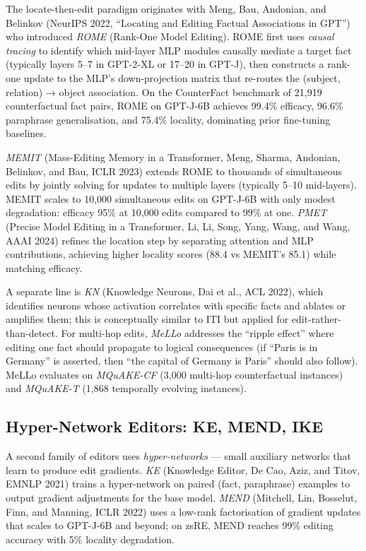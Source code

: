 \documentclass{article}
\begin{document}
The locate-then-edit paradigm originates with Meng, Bau, Andonian, and Belinkov (NeurIPS 2022, ``Locating and Editing Factual Associations in GPT'') who introduced \emph{ROME} (Rank-One Model Editing). ROME first uses \emph{causal tracing} to identify which mid-layer MLP modules causally mediate a target fact (typically layers 5--7 in GPT-2-XL or 17--20 in GPT-J), then constructs a rank-one update to the MLP's down-projection matrix that re-routes the (subject, relation) → object association. On the CounterFact benchmark of 21,919 counterfactual fact pairs, ROME on GPT-J-6B achieves 99.4\% efficacy, 96.6\% paraphrase generalisation, and 75.4\% locality, dominating prior fine-tuning baselines.

\emph{MEMIT} (Mass-Editing Memory in a Transformer, Meng, Sharma, Andonian, Belinkov, and Bau, ICLR 2023) extends ROME to thousands of simultaneous edits by jointly solving for updates to multiple layers (typically 5--10 mid-layers). MEMIT scales to 10,000 simultaneous edits on GPT-J-6B with only modest degradation: efficacy 95\% at 10,000 edits compared to 99\% at one. \emph{PMET} (Precise Model Editing in a Transformer, Li, Li, Song, Yang, Wang, and Wang, AAAI 2024) refines the location step by separating attention and MLP contributions, achieving higher locality scores (88.4 vs MEMIT's 85.1) while matching efficacy.

A separate line is \emph{KN} (Knowledge Neurons, Dai et al., ACL 2022), which identifies neurons whose activation correlates with specific facts and ablates or amplifies them; this is conceptually similar to ITI but applied for edit-rather-than-detect. For multi-hop edits, \emph{MeLLo} \citep{zhong2023mquakeassessingkno} addresses the ``ripple effect'' where editing one fact should propagate to logical consequences (if ``Paris is in Germany'' is asserted, then ``the capital of Germany is Paris'' should also follow). MeLLo evaluates on \emph{MQuAKE-CF} (3,000 multi-hop counterfactual instances) and \emph{MQuAKE-T} (1,868 temporally evolving instances).

\subsection{Hyper-Network Editors: KE, MEND, IKE}\label{hyper-network-editors-ke-mend-ike}

A second family of editors uses \emph{hyper-networks} --- small auxiliary networks that learn to produce edit gradients. \emph{KE} (Knowledge Editor, De Cao, Aziz, and Titov, EMNLP 2021) trains a hyper-network on paired (fact, paraphrase) examples to output gradient adjustments for the base model. \emph{MEND} (Mitchell, Lin, Bosselut, Finn, and Manning, ICLR 2022) uses a low-rank factorisation of gradient updates that scales to GPT-J-6B and beyond; on zsRE, MEND reaches 99\% editing accuracy with 5\% locality degradation.
\end{document}
